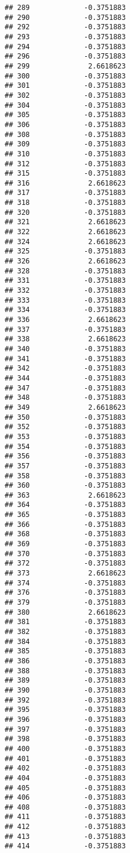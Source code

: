 \documentclass[
]{article}
\begin{document}
\begin{verbatim}
## 289             -0.3751883
## 290             -0.3751883
## 292             -0.3751883
## 293             -0.3751883
## 294             -0.3751883
## 296             -0.3751883
## 299              2.6618623
## 300             -0.3751883
## 301             -0.3751883
## 302             -0.3751883
## 304             -0.3751883
## 305             -0.3751883
## 306             -0.3751883
## 308             -0.3751883
## 309             -0.3751883
## 310             -0.3751883
## 312             -0.3751883
## 315             -0.3751883
## 316              2.6618623
## 317             -0.3751883
## 318             -0.3751883
## 320             -0.3751883
## 321              2.6618623
## 322              2.6618623
## 324              2.6618623
## 325             -0.3751883
## 326              2.6618623
## 328             -0.3751883
## 331             -0.3751883
## 332             -0.3751883
## 333             -0.3751883
## 334             -0.3751883
## 336              2.6618623
## 337             -0.3751883
## 338              2.6618623
## 340             -0.3751883
## 341             -0.3751883
## 342             -0.3751883
## 344             -0.3751883
## 347             -0.3751883
## 348             -0.3751883
## 349              2.6618623
## 350             -0.3751883
## 352             -0.3751883
## 353             -0.3751883
## 354             -0.3751883
## 356             -0.3751883
## 357             -0.3751883
## 358             -0.3751883
## 360             -0.3751883
## 363              2.6618623
## 364             -0.3751883
## 365             -0.3751883
## 366             -0.3751883
## 368             -0.3751883
## 369             -0.3751883
## 370             -0.3751883
## 372             -0.3751883
## 373              2.6618623
## 374             -0.3751883
## 376             -0.3751883
## 379             -0.3751883
## 380              2.6618623
## 381             -0.3751883
## 382             -0.3751883
## 384             -0.3751883
## 385             -0.3751883
## 386             -0.3751883
## 388             -0.3751883
## 389             -0.3751883
## 390             -0.3751883
## 392             -0.3751883
## 395             -0.3751883
## 396             -0.3751883
## 397             -0.3751883
## 398             -0.3751883
## 400             -0.3751883
## 401             -0.3751883
## 402             -0.3751883
## 404             -0.3751883
## 405             -0.3751883
## 406             -0.3751883
## 408             -0.3751883
## 411             -0.3751883
## 412             -0.3751883
## 413             -0.3751883
## 414             -0.3751883

\end{verbatim}
\end{document}
